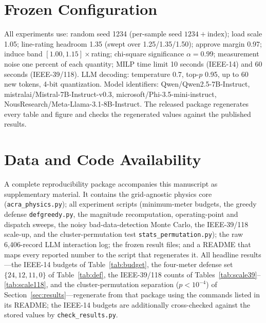 \documentclass{ieeeaccess}
\begin{document}
\section{Frozen Configuration}
All experiments use: random seed 1234 (per-sample seed $1234+\text{index}$); load scale 1.05; line-rating headroom 1.35 (swept over 1.25/1.35/1.50); approve margin 0.97; induce band $[1.00,1.15]\times$rating; chi-square significance $\alpha=0.99$; measurement noise one percent of each quantity; MILP time limit 10 seconds (IEEE-14) and 60 seconds (IEEE-39/118). LLM decoding: temperature 0.7, top-$p$ 0.95, up to 60 new tokens, 4-bit quantization. Model identifiers: Qwen/Qwen2.5-7B-Instruct, mistralai/Mistral-7B-Instruct-v0.3, microsoft/Phi-3.5-mini-instruct, NousResearch/Meta-Llama-3.1-8B-Instruct. The released package regenerates every table and figure and checks the regenerated values against the published results.

\section*{Data and Code Availability}
A complete reproducibility package accompanies this manuscript as supplementary material. It contains the grid-agnostic physics core (\texttt{acra\_physics.py}); all experiment scripts (minimum-meter budgets, the greedy defense \texttt{defgreedy.py}, the magnitude recomputation, operating-point and dispatch sweeps, the noisy bad-data-detection Monte Carlo, the IEEE-39/118 scale-up, and the cluster-permutation test \texttt{stats\_permutation.py}); the raw 6{,}406-record LLM interaction log; the frozen result files; and a README that maps every reported number to the script that regenerates it. All headline results---the IEEE-14 budgets of Table~\ref{tab:budget}, the four-meter defense set $\{24,12,11,0\}$ of Table~\ref{tab:def}, the IEEE-39/118 counts of Tables~\ref{tab:scale39}--\ref{tab:scale118}, and the cluster-permutation separation ($p<10^{-4}$) of Section~\ref{sec:results}---regenerate from that package using the commands listed in its README; the IEEE-14 budgets are additionally cross-checked against the stored values by \texttt{check\_results.py}.
\end{document}
